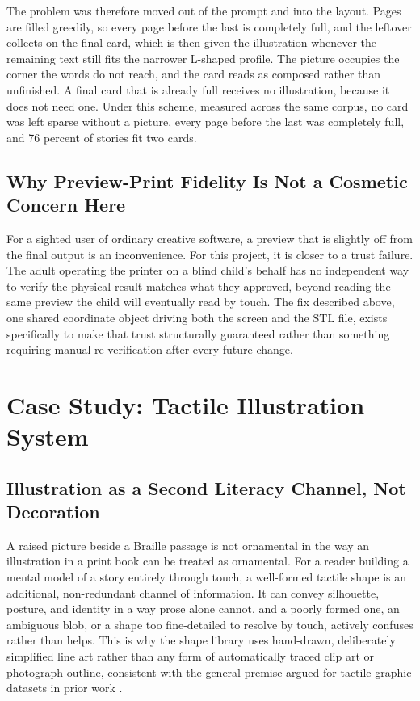 \documentclass[conference]{IEEEtran}
\begin{document}
The problem was therefore moved out of the prompt and into the layout. Pages are filled greedily, so every page before the last is completely full, and the leftover collects on the final card, which is then given the illustration whenever the remaining text still fits the narrower L-shaped profile. The picture occupies the corner the words do not reach, and the card reads as composed rather than unfinished. A final card that is already full receives no illustration, because it does not need one. Under this scheme, measured across the same corpus, no card was left sparse without a picture, every page before the last was completely full, and 76 percent of stories fit two cards.

\subsection{Why Preview-Print Fidelity Is Not a Cosmetic Concern Here}

For a sighted user of ordinary creative software, a preview that is slightly off from the final output is an inconvenience. For this project, it is closer to a trust failure. The adult operating the printer on a blind child's behalf has no independent way to verify the physical result matches what they approved, beyond reading the same preview the child will eventually read by touch. The fix described above, one shared coordinate object driving both the screen and the STL file, exists specifically to make that trust structurally guaranteed rather than something requiring manual re-verification after every future change.

\section{Case Study: Tactile Illustration System}\label{sec:illustration}

\subsection{Illustration as a Second Literacy Channel, Not Decoration}

A raised picture beside a Braille passage is not ornamental in the way an illustration in a print book can be treated as ornamental. For a reader building a mental model of a story entirely through touch, a well-formed tactile shape is an additional, non-redundant channel of information. It can convey silhouette, posture, and identity in a way prose alone cannot, and a poorly formed one, an ambiguous blob, or a shape too fine-detailed to resolve by touch, actively confuses rather than helps. This is why the shape library uses hand-drawn, deliberately simplified line art rather than any form of automatically traced clip art or photograph outline, consistent with the general premise argued for tactile-graphic datasets in prior work \cite{tactilenet}.
\end{document}
